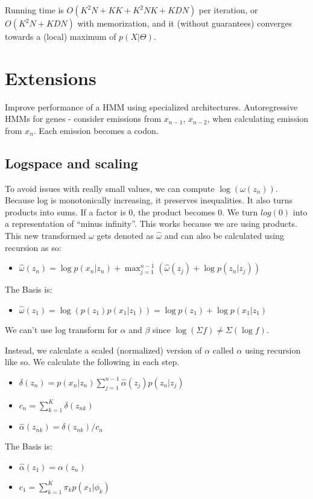 \documentclass{article}
\begin{document}
        Running time is $O(K^2N + KK + K^2NK + KDN)$ per iteration, or $O(K^2N + KDN)$ with memorization, and it (without guarantees) converges towards a (local) maximum of $p( X | \Theta)$.
        
        
        
\section{Extensions}
    Improve performance of a HMM using specialized architectures.
    Autoregressive HMMs for genes - consider emissions from $x_{n-1}$, $x_{n-2}$, when calculating emission from $x_n$. Each emission becomes a codon.    
    
    
    \subsection{Logspace and scaling}
  To avoid issues with really small values, we can compute $\log(\omega(z_n))$. Because log is monotonically increasing, it preserves inequalities. It also turns products into sums. If a factor is $0$, the product becomes $0$. We turn $log(0)$ into a representation of ``minus infinity''. This works because we are using products.
  This new transformed $\omega$ gets denoted as $\hat{\omega}$ and can also be calculated using recursion as so:
  \begin{itemize}
    \item $\hat{\omega}(z_n) = \log p(x_n | z_n) + \max_{j=1}^{n-1}(\hat{\omega}(z_j)+\log p(z_n | z_j))$
  \end{itemize}
  The Basis is:
  \begin{itemize}
    \item $\hat{\omega}(z_1) = \log(p(z_1)p(x_1|z_1)) = \log p(z_1) + \log p(x_1 | z_1)$
  \end{itemize}


  We can't use log transform for $\alpha$ and $\beta$ since $\log(\Sigma f) \neq \Sigma(\log f)$.

  Instead, we calculate a scaled (normalized) version of $\alpha$ called $\hat{\alpha}$ using recursion like so. We calculate the following in each step.
  \begin{itemize}
    \item $\delta(z_n) = p(x_n|z_n)\sum_{j=1}^{n-1}\hat{\alpha}(z_j)p(z_n|z_j)$
    \item $c_n = \sum_{k=1}^K\delta(z_{nk})$
    \item $\hat{\alpha}(z_{nk}) = \delta(z_{nk})/c_n$
  \end{itemize}
  The Basis is:
  \begin{itemize}
    \item $\hat{\alpha}(z_1) = \alpha(z_n)$
    \item $c_1 = \sum_{k=1}^K\pi_k p(x_1|\phi_k)$
  \end{itemize}
\end{document}
